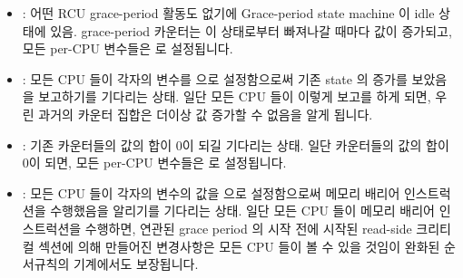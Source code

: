 \begin{itemize}
\item	{}:  어떤 RCU grace-period 활동도 없기에
	Grace-period state machine 이 idle 상태에 있음.
	 grace-period 카운터는 이 상태로부터 빠져나갈
	때마다 값이 증가되고, 모든 per-CPU  변수들은
	 로 설정됩니다.
\item	{}:
	모든 CPU 들이 각자의  변수를  으로
	설정함으로써 기존 state 의 증가를 보았음을 보고하기를 기다리는 상태.
	일단 모든 CPU 들이 이렇게 보고를 하게 되면, 우린 과거의 카운터 집합은
	더이상 값 증가할 수 없음을 알게 됩니다.
\item	{}:
	기존 카운터들의 값의 합이 0이 되길 기다리는 상태.
	일단 카운터들의 값의 합이 0이 되면, 모든 per-CPU 
	변수들은  로 설정됩니다.
\item	{}:
	모든 CPU 들이 각자의  변수의 값을  으로
	설정함으로써 메모리 배리어 인스트럭션을 수행했음을 알리기를 기다리는
	상태.
	일단 모든 CPU 들이 메모리 배리어 인스트럭션을 수행하면, 연관된 grace
	period 의 시작 전에 시작된 read-side 크리티컬 섹션에 의해 만들어진
	변경사항은 모든 CPU 들이 볼 수 있을 것임이 완화된 순서규칙의 기계에서도
	보장됩니다.

\end{itemize}

